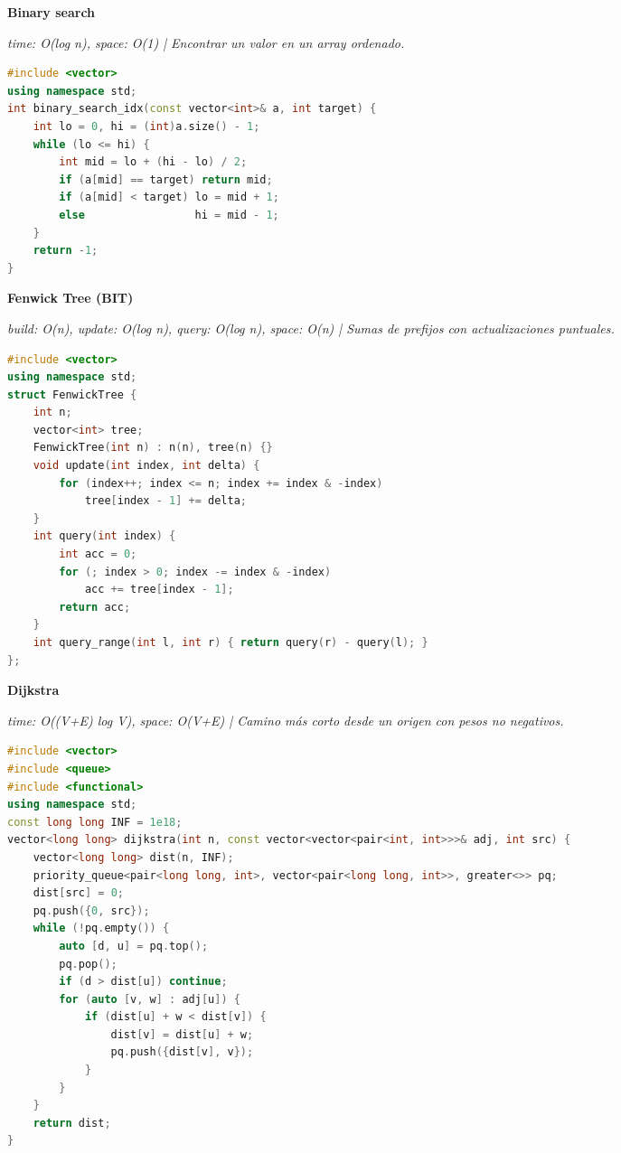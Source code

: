 \documentclass[8pt,a4paper,landscape]{extarticle}
\makeatletter
\newcommand{\csalgo}[1]{%
  \vspace{0.8ex}%
  {\bfseries\small #1}\par
  \vspace{0.4ex}{\color{cs@rule}\hrule height 0.4pt}\vspace{0.5ex}%
}
\newcommand{\csstats}[1]{{\scriptsize\itshape #1\par\vspace{0.3ex}}}
\makeatother
\begin{document}
\begin{multicols}{3}
\csalgo{Binary search}
\csstats{time: O(log n), space: O(1)  |  Encontrar un valor en un array ordenado.}
\begin{lstlisting}[language=C++]
#include <vector>
using namespace std;
int binary_search_idx(const vector<int>& a, int target) {
    int lo = 0, hi = (int)a.size() - 1;
    while (lo <= hi) {
        int mid = lo + (hi - lo) / 2;
        if (a[mid] == target) return mid;
        if (a[mid] < target) lo = mid + 1;
        else                 hi = mid - 1;
    }
    return -1;
}
\end{lstlisting}

\csalgo{Fenwick Tree (BIT)}
\csstats{build: O(n), update: O(log n), query: O(log n), space: O(n)  |  Sumas de prefijos con actualizaciones puntuales.}
\begin{lstlisting}[language=C++]
#include <vector>
using namespace std;
struct FenwickTree {
    int n;
    vector<int> tree;
    FenwickTree(int n) : n(n), tree(n) {}
    void update(int index, int delta) {
        for (index++; index <= n; index += index & -index)
            tree[index - 1] += delta;
    }
    int query(int index) {
        int acc = 0;
        for (; index > 0; index -= index & -index)
            acc += tree[index - 1];
        return acc;
    }
    int query_range(int l, int r) { return query(r) - query(l); }
};
\end{lstlisting}

\csalgo{Dijkstra}
\csstats{time: O((V+E) log V), space: O(V+E)  |  Camino más corto desde un origen con pesos no negativos.}
\begin{lstlisting}[language=C++]
#include <vector>
#include <queue>
#include <functional>
using namespace std;
const long long INF = 1e18;
vector<long long> dijkstra(int n, const vector<vector<pair<int, int>>>& adj, int src) {
    vector<long long> dist(n, INF);
    priority_queue<pair<long long, int>, vector<pair<long long, int>>, greater<>> pq;
    dist[src] = 0;
    pq.push({0, src});
    while (!pq.empty()) {
        auto [d, u] = pq.top();
        pq.pop();
        if (d > dist[u]) continue;
        for (auto [v, w] : adj[u]) {
            if (dist[u] + w < dist[v]) {
                dist[v] = dist[u] + w;
                pq.push({dist[v], v});
            }
        }
    }
    return dist;
}
\end{lstlisting}


\end{multicols}
\end{document}
